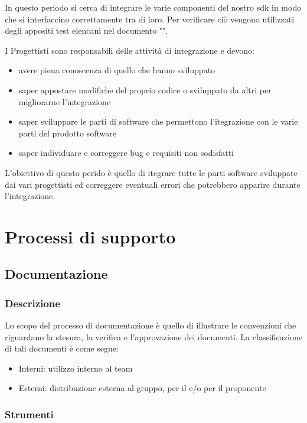 In questo periodo si cerca di integrare le varie componenti del nostro sdk in modo che si interfaccino correttamente tra di loro.
Per verificare ciò vengono utilizzati degli appositi test elencani nel documento "\pianodiqualifica".

I Progettisti sono responsabili delle attività di integrazione e devono:
\begin{itemize}
	\item avere piena conoscenza di quello che hanno sviluppato
	\item saper appostare modifiche del proprio codice o sviluppato da altri per migliorarne l'integrazione
	\item saper sviluppare le parti di software che permettono l'itegrazione con le varie parti del prodotto software
	\item saper individuare e correggere bug e requisiti non sodisfatti
\end{itemize}

L'obiettivo di questo perido è quello di itegrare tutte le parti software sviluppate dai vari progettisti ed correggere eventuali errori che potrebbero apparire durante l'integrazione.





\section{Processi di supporto}
\subsection{Documentazione}
\subsubsection{Descrizione }
Lo scopo del processo di documentazione è quello di illustrare le
convenzioni che riguardano la stesura, la verifica e l’approvazione
dei documenti. La classificazione di tali documenti è come segue: 
\begin{itemize} 
\item Interni: utilizzo interno al team
\item Esterni: distribuzione esterna al gruppo, per il  e/o per il proponente
\end{itemize}

\subsubsection{Strumenti}

